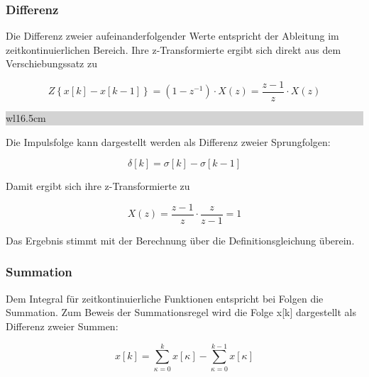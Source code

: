 \subsubsection{Differenz}

\noindent Die Differenz zweier aufeinanderfolgender Werte entspricht der Ableitung im zeitkontinuierlichen Bereich. Ihre z-Transformierte ergibt sich direkt aus dem Verschiebungssatz zu 

\begin{equation}\label{eq:fivefiftyeight}
Z\left\{x\left[k\right]-x\left[k-1\right]\right\}=\left(1-z^{-1} \right)\cdot X\left(z\right)=\frac{z-1}{z} \cdot X\left(z\right)
\end{equation}

\noindent
\colorbox{lightgray}{%
%
\renewcommand\arraystretch{0.6}%
\begin{tabular}{ wl{16.5cm} }
{\selectfont{Beispiel: Differenz}}
\end{tabular}%
}\medskip

\noindent Die Impulsfolge kann dargestellt werden als Differenz zweier Sprungfolgen:

\begin{equation}\label{eq:fivefiftynine}
\delta \left[k\right]=\sigma \left[k\right]-\sigma \left[k-1\right]
\end{equation}

\noindent Damit ergibt sich ihre z-Transformierte zu

\begin{equation}\label{eq:fivesixty}
X\left(z\right)=\frac{z-1}{z} \cdot \frac{z}{z-1} =1
\end{equation}

\noindent Das Ergebnis stimmt mit der Berechnung \"{u}ber die Definitionsgleichung \"{u}berein. 

\subsubsection{Summation}

\noindent Dem Integral f\"{u}r zeitkontinuierliche Funktionen entspricht bei Folgen die Summation. Zum Beweis der Summationsregel wird die Folge x[k] dargestellt als Differenz zweier Summen:

\begin{equation}\label{eq:fivesixtyone}
x\left[k\right]=\sum _{\kappa =0}^{k}x\left[\kappa \right]- \sum _{\kappa =0}^{k-1}x\left[\kappa \right]
\end{equation}

